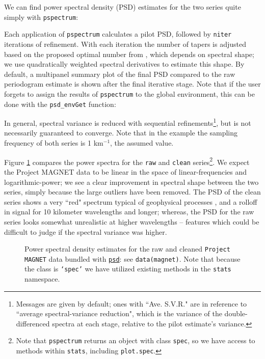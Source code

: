 \documentclass[10pt]{article}\usepackage[]{graphicx}\usepackage[]{color}
\newcommand{\Rcmd}[1]{\texttt{#1}}
\newcommand{\psd}[0]{\href{http://www.github.com/abarbour/psd/}{\color{blue}\Rcmd{psd}}}
\begin{document}
We can find power spectral density (PSD)
estimates for the two series quite simply with \Rcmd{pspectrum}:

Each application of \Rcmd{pspectrum} calculates a pilot PSD, followed by 
\Rcmd{niter}
iterations of refinement.
With each iteration
the number of tapers is adjusted 
based on the proposed optimal number from \citet{rs1995}, which
depends on spectral shape; we use 
quadratically weighted spectral derivatives \citep{prieto2007}
to estimate this shape.
By default, a multipanel summary plot of the final PSD compared
to the raw periodogram estimate is shown after the final iterative stage.
Note that if the user forgets to assign the results of
\Rcmd{pspectrum} to the global environment, this can be
done with the \Rcmd{psd\_envGet} function:


In general, spectral variance is reduced
with sequential refinements\footnote{
Messages are given by default; ones with
``Ave. S.V.R."
are in reference to 
 ``average spectral-variance reduction", which
 is the variance of the
 double-differenced spectra at each stage, relative
 to the pilot estimate's variance.
}, but is not necessarily guaranteed to converge.
Note that in the example
the sampling frequency of both series
is 1 km$^{-1}$, the assumed value.

Figure \ref{fig:pmag} compares the 
power spectra for the \Rcmd{raw} and \Rcmd{clean} 
series\footnote{
Note that \Rcmd{pspectrum} returns
an object with class \Rcmd{spec}, so we have access to methods 
within \Rcmd{stats}, including \Rcmd{plot.spec}.
}.  
We expect the Project MAGNET data to be linear in the space of
linear-frequencies and logarithmic-power;
we see a clear
improvement in spectral shape between the two series,
simply because the large outliers have been removed.
The PSD of the clean series shows a
very ``red" spectrum typical of geophysical processes \citep{agnew1992},
and a rolloff in signal
for 10 kilometer wavelengths and longer; whereas, the 
PSD for the raw series looks somewhat unrealistic at higher wavelengths -- features 
which could be difficult to judge if the spectral variance was higher.

\begin{figure}[!htbp]
\begin{center}

\caption{Power spectral density estimates for the raw and cleaned
             \Rcmd{Project MAGNET} data bundled with \psd{}: see \Rcmd{data(magnet)}. 
             Note that because the class is \Rcmd{`spec'} we have
             utilized  existing methods in the \Rcmd{stats} namespace.}
\label{fig:pmag}
\end{center}
\end{figure}
\end{document}
